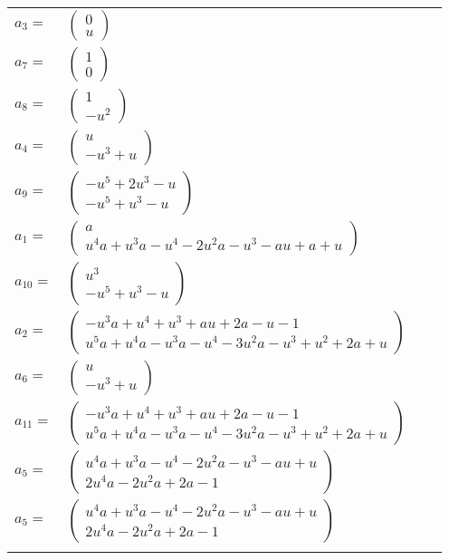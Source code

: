 \documentclass[1p]{elsarticle_modified}
\theoremstyle{definition}
\begin{document}
\begin{tabular}{m{7pt} m{180pt} m{7pt} m{180pt} }
\flushright $a_{3}=$&$\begin{pmatrix}0\\u\end{pmatrix}$ \\
\flushright $a_{7}=$&$\begin{pmatrix}1\\0\end{pmatrix}$ \\
\flushright $a_{8}=$&$\begin{pmatrix}1\\- u^2\end{pmatrix}$ \\
\flushright $a_{4}=$&$\begin{pmatrix}u\\- u^3+u\end{pmatrix}$ \\
\flushright $a_{9}=$&$\begin{pmatrix}- u^5+2 u^3- u\\- u^5+u^3- u\end{pmatrix}$ \\
\flushright $a_{1}=$&$\begin{pmatrix}a\\u^4 a+u^3 a- u^4-2 u^2 a- u^3- a u+a+u\end{pmatrix}$ \\
\flushright $a_{10}=$&$\begin{pmatrix}u^3\\- u^5+u^3- u\end{pmatrix}$ \\
\flushright $a_{2}=$&$\begin{pmatrix}- u^3 a+u^4+u^3+a u+2 a- u-1\\u^5 a+u^4 a- u^3 a- u^4-3 u^2 a- u^3+u^2+2 a+u\end{pmatrix}$ \\
\flushright $a_{6}=$&$\begin{pmatrix}u\\- u^3+u\end{pmatrix}$ \\
\flushright $a_{11}=$&$\begin{pmatrix}- u^3 a+u^4+u^3+a u+2 a- u-1\\u^5 a+u^4 a- u^3 a- u^4-3 u^2 a- u^3+u^2+2 a+u\end{pmatrix}$ \\
\flushright $a_{5}=$&$\begin{pmatrix}u^4 a+u^3 a- u^4-2 u^2 a- u^3- a u+u\\2 u^4 a-2 u^2 a+2 a-1\end{pmatrix}$\\ \flushright $a_{5}=$&$\begin{pmatrix}u^4 a+u^3 a- u^4-2 u^2 a- u^3- a u+u\\2 u^4 a-2 u^2 a+2 a-1\end{pmatrix}$\\&\end{tabular}
\end{document}
